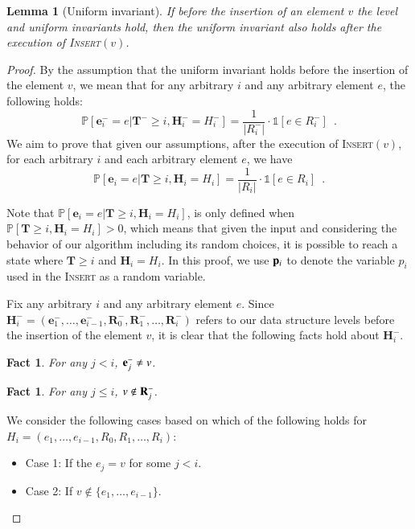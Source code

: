 \documentclass[11pt]{article}
\newtheorem{lemma}[theorem]{Lemma}
\newtheorem{fact}[theorem]{Fact}
\renewcommand{\Pr}[1]{\ensuremath{\mathbb{P}\left[#1\right]}}
\newcommand{\ind}[1]{\ensuremath{\mathds{1}\left[#1\right]}}
\newcommand{\insertv}{{\textsc{Insert}}}
\newcommand{\bR}{\ensuremath{\mathbf{R}}}
\newcommand{\bE}{\ensuremath{\mathbf{e}}}
\newcommand{\bT}{\ensuremath{\mathbf{T}}}
\newcommand{\bH}{\ensuremath{\mathbf{H}}}
\begin{document}
\begin{lemma} [Uniform invariant]
\label{cardinality:mat_insert_uni}
If before the insertion of an element $v$ the level and uniform invariants hold, then the uniform invariant also holds after the execution of \insertv$(v)$. 
\end{lemma}

\begin{proof} 
By the assumption that the uniform invariant holds before the insertion of the element $v$, we mean that for any arbitrary $i$ and any arbitrary element $e$, the following holds:
\[
    \Pr{\bE_i^- = e | \bT^- \geq i, \bH_i^- = H_i^-} = 
    \frac{1}{|R_i^{-}|} \cdot \ind{e \in R_i^{-}} \enspace.
\]
We aim to prove that given our assumptions,
after the execution of \insertv$(v)$, for each arbitrary $i$ and each arbitrary element $e$, we have 
\[
    \Pr{\bE_i = e | \bT \geq i, \bH_i = H_i} = 
    \frac{1}{|R_i|} \cdot \ind{e \in R_i} \enspace .
\]

Note that $\Pr{\bE_i = e | \bT \geq i, \bH_i = H_i}$, is only defined when 
$\Pr{\bT \geq i, \bH_i = H_i} > 0$, which means that given the input and considering the behavior of our algorithm including its random choices, it is possible to reach a state where $\bT \geq i$ and $\bH_i = H_i$.
In this proof, we use $\bold{p}_i$ to denote the variable $p_i$ used in the \insertv{} as a random variable.

Fix any arbitrary $i$ and any arbitrary element $e$. Since $\bH_i^- = (\bE_1^-, \dots, \bE_{i - 1}^-, \bR_0^-, \bR_1^-, \dots, \bR_i^-)$ refers to our data structure levels before the insertion of the element $v$, it is clear that the following facts hold about $\bH_i^-$. 

\begin{fact}
\label{cardinality:ebeforeinsert}
For any $j < i$, $\bold{e}_j^- \neq v$.
\end{fact}

\begin{fact}
\label{cardinality:rbeforeinsert}
For any $j \leq i$, $v \notin \bold{R}_j^-$.
\end{fact}

We consider the following cases based on which of the following holds for $H_i = (e_1, \dots, e_{i - 1}, R_0, R_1, \dots, R_i)$:
\begin{itemize}
    \item Case 1: If the $e_j = v$ for some $j < i$.
    \item Case 2: If $v \notin \{e_1, \dots, e_{i - 1}\}$.
\end{itemize}


\end{proof}
\end{document}
